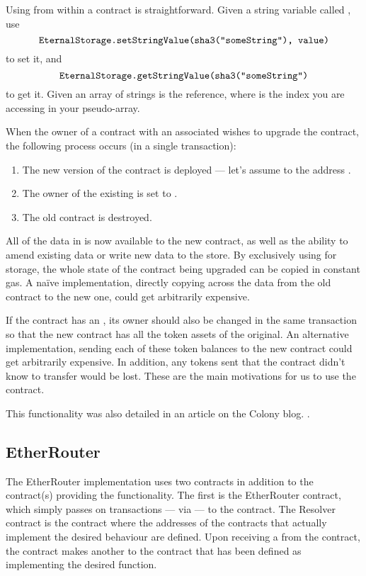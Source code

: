 Using  from within a contract is straightforward. Given a string variable called , use
\[
\texttt{EternalStorage.setStringValue(sha3("someString"), value)}
\]
to set it, and
\[
\texttt{EternalStorage.getStringValue(sha3("someString")}
\]
to get it. Given an array of strings  is the reference, where  is the index you are accessing in your pseudo-array.

When the owner of a contract with an associated  wishes to upgrade the contract, the following process occurs (in a single transaction):

\begin{enumerate}
\item The new version of the contract is deployed --- let's assume to the address .
\item The owner of the existing  is set to .
\item The old contract is destroyed.
\end{enumerate}

All of the data in  is now available to the new contract, as well as the ability to amend existing data or write new data to the store. By exclusively using  for storage, the whole state of the contract being upgraded can be copied in constant gas. A na{\"i}ve implementation, directly copying across the data from the old contract to the new one, could get arbitrarily expensive.

If the contract has an , its owner should also be changed in the same transaction so that the new contract has all the token assets of the original. An alternative implementation, sending each of these token balances to the new contract could get arbitrarily expensive. In addition, any tokens sent that the contract didn't know to transfer would be lost. These are the main motivations for us to use the  contract.

 This functionality was also detailed in an article on the Colony blog. \cite{UpgradingContracts}. 



\subsection{EtherRouter}

The EtherRouter implementation uses two contracts in addition to the contract(s) providing the functionality. The first is the EtherRouter contract, which simply passes on transactions --- via  --- to the  contract. The Resolver contract is the contract where the addresses of the contracts that actually implement the desired behaviour are defined. Upon receiving a  from the  contract, the  contract makes another  to the contract that has been defined as implementing the desired function.

